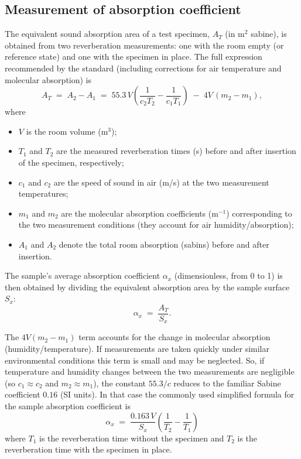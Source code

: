 \subsection{Measurement of absorption coefficient}

The equivalent sound absorption area of a test specimen, \(A_T\) (in m\(^2\) sabine), is obtained from two reverberation measurements: one with the room empty (or reference state) and one with the specimen in place. The full expression recommended by the standard (including corrections for air temperature and molecular absorption) is
\begin{equation}
A_T \;=\; A_2 - A_1 \;=\; 55.3\,V\!\left(\frac{1}{c_2 T_2}-\frac{1}{c_1 T_1}\right)\;-\;4V\,(m_2-m_1),
\end{equation}
where
\begin{itemize}
  \item \(V\) is the room volume (m\(^3\));
  \item \(T_1\) and \(T_2\) are the measured reverberation times (s) before and after insertion of the specimen, respectively;
  \item \(c_1\) and \(c_2\) are the speed of sound in air (m/s) at the two measurement temperatures;
  \item \(m_1\) and \(m_2\) are the molecular absorption coefficients (m\(^{-1}\)) corresponding to the two measurement conditions (they account for air humidity/absorption);
  \item \(A_1\) and \(A_2\) denote the total room absorption (sabins) before and after insertion.
\end{itemize}

The sample's average absorption coefficient \(\alpha_x\) (dimensionless, from 0 to 1) is then obtained by dividing the equivalent absorption area by the sample surface \(S_x\):
\begin{equation}
\alpha_x \;=\; \frac{A_T}{S_x}.
\end{equation}

The \(4V(m_2-m_1)\) term accounts for the change in molecular absorption (humidity/temperature). If measurements are taken quickly under similar environmental conditions this term is small and may be neglected. So, if temperature and humidity changes between the two measurements are negligible (so \(c_1\approx c_2\) and \(m_2\approx m_1\)), the constant \(55.3/c\) reduces to the familiar Sabine coefficient \(0.16\) (SI units). In that case the commonly used simplified formula for the sample absorption coefficient is
\begin{equation}
\boxed{\;\alpha_x \;=\; \frac{0.163\,V}{S_x}\!\left(\frac{1}{T_2}-\frac{1}{T_1}\right)\; }
\end{equation}
where \(T_1\) is the reverberation time without the specimen and \(T_2\) is the reverberation time with the specimen in place.

